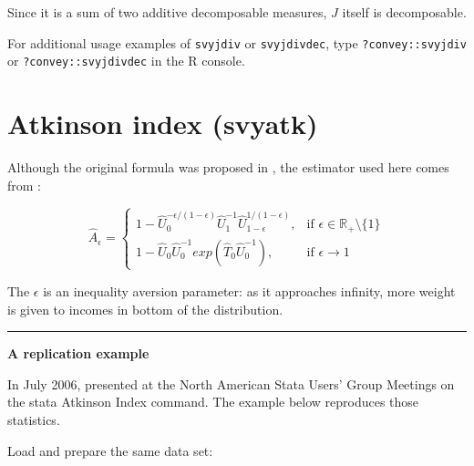 \documentclass[]{book}
\begin{document}
Since it is a sum of two additive decomposable measures, \(J\) itself is decomposable.

For additional usage examples of \texttt{svyjdiv} or \texttt{svyjdivdec}, type \texttt{?convey::svyjdiv} or \texttt{?convey::svyjdivdec} in the R console.

\hypertarget{atkinson-index-svyatk}{%
\section{Atkinson index (svyatk)}\label{atkinson-index-svyatk}}

Although the original formula was proposed in \citet{atkinson1970}, the estimator used here comes from \citet{biewen2003}:

\[
\widehat{A}_\epsilon =
\begin{cases}
 1 - \widehat{U}_0^{ - \epsilon/(1 - \epsilon) } \widehat{U}_1^{ -1 } \widehat{U}_{1 - \epsilon}^{ 1/(1 - \epsilon) } , &\text{if } \epsilon \in \mathbb{R}_+ \setminus\{ 1 \} \\
1 - \widehat{U}_0 \widehat{U}_0^{-1} exp( \widehat{T}_0 \widehat{U}_0^{-1} ), &\text{if } \epsilon \rightarrow1
\end{cases}
\]

The \(\epsilon\) is an inequality aversion parameter: as it approaches infinity, more weight is given to incomes in bottom of the distribution.

\begin{center}\rule{0.5\linewidth}{0.5pt}\end{center}

\textbf{A replication example}

In July 2006, \citet{jenkins2006} presented at the North American Stata Users' Group Meetings on the stata Atkinson Index command. The example below reproduces those statistics.

Load and prepare the same data set:
\end{document}
